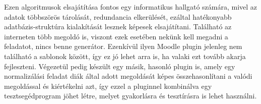 Ezen algoritmusok elsajátítása fontos egy informatikus hallgató számára, mivel az adatok többszörös tárolását, redundancia elkerülését, ezáltal hatékonyabb adatbázis-struktúra kialakítását lesznek képesek elsajátítani. Található az interneten több megoldó is, viszont ezek esetében nekünk kell megadni a feladatot, nincs benne generátor. Ezenkívül ilyen Moodle plugin jelenleg nem található a sablonok között, így ez jó lehet arra is, ha valaki ezt tovább akarja fejleszteni. Végezetül pedig készült egy másik, hasonló plugin is, amely egy normalizálási feladat diák által adott megoldását képes összehasonlítani a valódi megoldással és kiértékelni azt, így ezzel a pluginnel kombinálva egy tesztsegédprogram jöhet létre, melyet gyakorlásra és tesztírásra is lehet használni.
